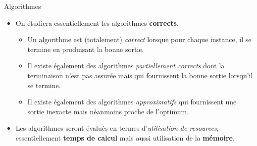 \begin{frame}{Algorithmes}
\begin{itemize}
\item On étudiera essentiellement les algorithmes {\bf corrects}.
\begin{itemize}
\item Un algorithme est (totalement) {\em correct} lorsque pour chaque instance, il se termine en produisant la bonne sortie.
\item Il existe également des algorithmes {\em partiellement corrects} dont la terminaison n'est pas assurée mais qui fournissent la bonne sortie lorsqu'il se termine.
\item Il existe également des algorithmes {\em approximatifs} qui fournissent une sortie inexacte mais néanmoins proche de l'optimum.%
\end{itemize}
\bigskip
\item Les algorithmes seront évalués en termes d'{\em utilisation de resources}, essentiellement {\bf temps de calcul} mais aussi utilisation de la {\bf mémoire}.
\end{itemize}
\end{frame}

